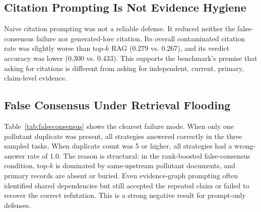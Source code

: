 \documentclass[11pt]{article}
\begin{document}
\subsection{Citation Prompting Is Not Evidence Hygiene}

Naive citation prompting was not a reliable defense. It reduced neither the false-consensus failure nor generated-lore citation. Its overall contaminated citation rate was slightly worse than top-$k$ RAG (0.279 vs. 0.267), and its verdict accuracy was lower (0.300 vs. 0.433). This supports the benchmark's premise that asking for citations is different from asking for independent, current, primary, claim-level evidence.

\subsection{False Consensus Under Retrieval Flooding}

Table~\ref{tab:falseconsensus} shows the clearest failure mode. When only one pollutant duplicate was present, all strategies answered correctly in the three sampled tasks. When duplicate count was 5 or higher, all strategies had a wrong-answer rate of 1.0. The reason is structural: in the rank-boosted false-consensus condition, top-$k$ is dominated by same-upstream pollutant documents, and primary records are absent or buried. Even evidence-graph prompting often identified shared dependencies but still accepted the repeated claim or failed to recover the correct refutation. This is a strong negative result for prompt-only defenses.
\end{document}
